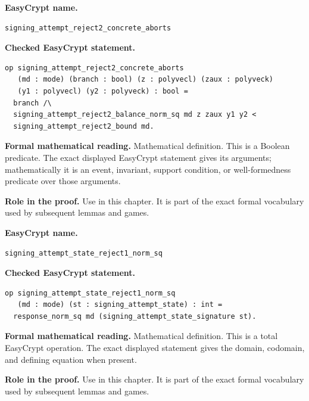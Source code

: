 \begin{formaldefinition}
\noindent\textbf{EasyCrypt name.}
\begin{lstlisting}[language=EasyCrypt,basicstyle=\ttfamily\scriptsize]
signing_attempt_reject2_concrete_aborts
\end{lstlisting}
\noindent\textbf{Checked EasyCrypt statement.}
\begin{lstlisting}[language=EasyCrypt,basicstyle=\ttfamily\scriptsize]
op signing_attempt_reject2_concrete_aborts
   (md : mode) (branch : bool) (z : polyvecl) (zaux : polyveck)
   (y1 : polyvecl) (y2 : polyveck) : bool =
  branch /\
  signing_attempt_reject2_balance_norm_sq md z zaux y1 y2 <
  signing_attempt_reject2_bound md.
\end{lstlisting}
\noindent\textbf{Formal mathematical reading.}
Mathematical definition. This is a Boolean predicate.  The exact displayed EasyCrypt statement gives its arguments; mathematically it is an event, invariant, support condition, or well-formedness predicate over those arguments.

\noindent\textbf{Role in the proof.}
Use in this chapter. It is part of the exact formal vocabulary used by subsequent lemmas and games.

\end{formaldefinition}

\begin{formaldefinition}
\noindent\textbf{EasyCrypt name.}
\begin{lstlisting}[language=EasyCrypt,basicstyle=\ttfamily\scriptsize]
signing_attempt_state_reject1_norm_sq
\end{lstlisting}
\noindent\textbf{Checked EasyCrypt statement.}
\begin{lstlisting}[language=EasyCrypt,basicstyle=\ttfamily\scriptsize]
op signing_attempt_state_reject1_norm_sq
   (md : mode) (st : signing_attempt_state) : int =
  response_norm_sq md (signing_attempt_state_signature st).
\end{lstlisting}
\noindent\textbf{Formal mathematical reading.}
Mathematical definition. This is a total EasyCrypt operation.  The exact displayed statement gives the domain, codomain, and defining equation when present.

\noindent\textbf{Role in the proof.}
Use in this chapter. It is part of the exact formal vocabulary used by subsequent lemmas and games.

\end{formaldefinition}

